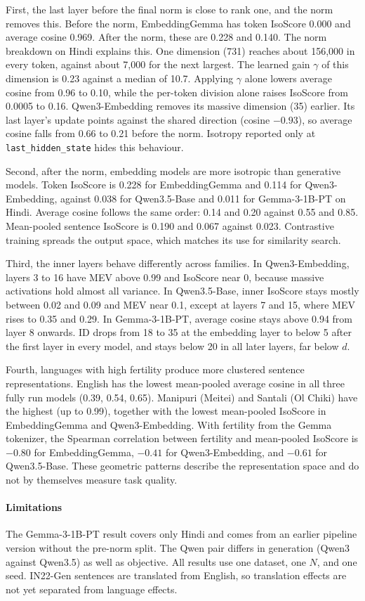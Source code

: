 First, the last layer before the final norm is close to rank one, and the norm removes this. Before the norm, EmbeddingGemma has token IsoScore 0.000 and average cosine 0.969. After the norm, these are 0.228 and 0.140. The norm breakdown on Hindi explains this. One dimension (731) reaches about 156{,}000 in every token, against about 7{,}000 for the next largest. The learned gain $\gamma$ of this dimension is 0.23 against a median of 10.7. Applying $\gamma$ alone lowers average cosine from 0.96 to 0.10, while the per-token division alone raises IsoScore from 0.0005 to 0.16. Qwen3-Embedding removes its massive dimension (35) earlier. Its last layer's update points against the shared direction (cosine $-0.93$), so average cosine falls from 0.66 to 0.21 before the norm. Isotropy reported only at \texttt{last\_hidden\_state} hides this behaviour.

Second, after the norm, embedding models are more isotropic than generative models. Token IsoScore is 0.228 for EmbeddingGemma and 0.114 for Qwen3-Embedding, against 0.038 for Qwen3.5-Base and 0.011 for Gemma-3-1B-PT on Hindi. Average cosine follows the same order: 0.14 and 0.20 against 0.55 and 0.85. Mean-pooled sentence IsoScore is 0.190 and 0.067 against 0.023. Contrastive training spreads the output space, which matches its use for similarity search.

Third, the inner layers behave differently across families. In Qwen3-Embedding, layers 3 to 16 have MEV above 0.99 and IsoScore near 0, because massive activations hold almost all variance. In Qwen3.5-Base, inner IsoScore stays mostly between 0.02 and 0.09 and MEV near 0.1, except at layers 7 and 15, where MEV rises to 0.35 and 0.29. In Gemma-3-1B-PT, average cosine stays above 0.94 from layer 8 onwards. ID drops from 18 to 35 at the embedding layer to below 5 after the first layer in every model, and stays below 20 in all later layers, far below $d$.

Fourth, languages with high fertility produce more clustered sentence representations. English has the lowest mean-pooled average cosine in all three fully run models (0.39, 0.54, 0.65). Manipuri (Meitei) and Santali (Ol Chiki) have the highest (up to 0.99), together with the lowest mean-pooled IsoScore in EmbeddingGemma and Qwen3-Embedding. With fertility from the Gemma tokenizer, the Spearman correlation between fertility and mean-pooled IsoScore is $-0.80$ for EmbeddingGemma, $-0.41$ for Qwen3-Embedding, and $-0.61$ for Qwen3.5-Base. These geometric patterns describe the representation space and do not by themselves measure task quality.

\paragraph{Limitations}
The Gemma-3-1B-PT result covers only Hindi and comes from an earlier pipeline version without the pre-norm split. The Qwen pair differs in generation (Qwen3 against Qwen3.5) as well as objective. All results use one dataset, one $N$, and one seed. IN22-Gen sentences are translated from English, so translation effects are not yet separated from language effects.

